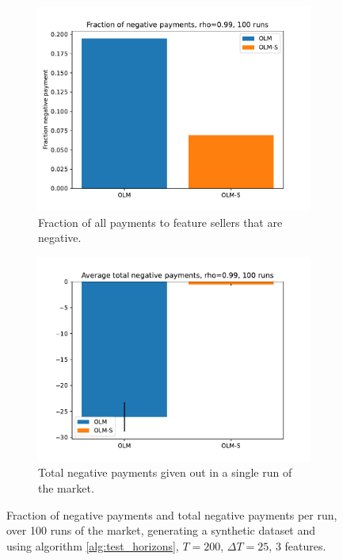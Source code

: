 \begin{figure}
  \centering
  \begin{subfigure}{.4\textwidth}
    \centering
    \includegraphics[width=.9\linewidth]{Pictures/negative_fraction.pdf}
    \caption{Fraction of all payments to feature sellers that are negative.}
    \label{fig:negative_fraction}
  \end{subfigure}%
  \hspace{1em}
  \begin{subfigure}{.4\textwidth}
    \centering
    \includegraphics[width=.9\linewidth]{Pictures/negative_total.pdf}
    \caption{Total negative payments given out in a single run of the market.}
    \label{fig:negative_total}
  \end{subfigure}%
  \caption{Fraction of negative payments and total negative payments per run, over
    100 runs of the market, generating a synthetic dataset and using algorithm
    \ref{alg:test_horizons}, $T=200$, $\Delta T=25$, 3 features.}
  \label{fig:negative_payments}
\end{figure}

